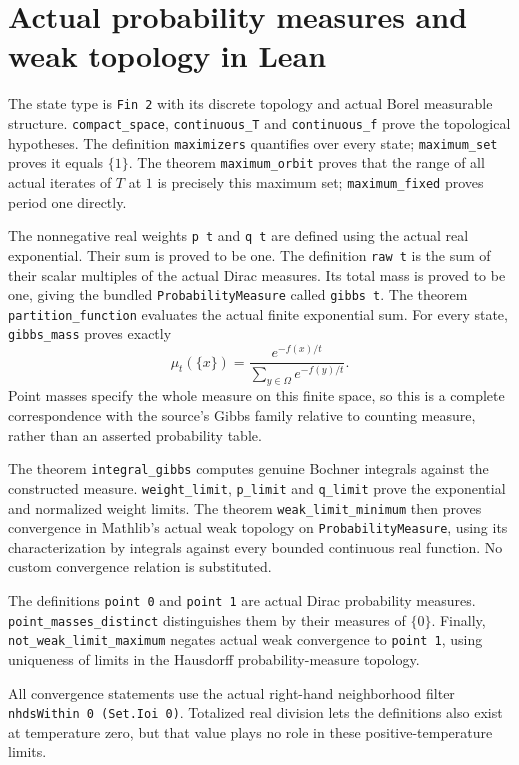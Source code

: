 \documentclass[11pt]{article}
\begin{document}
\newpage
\raggedright
\section*{Actual probability measures and weak topology in Lean}
The state type is \texttt{Fin 2} with its discrete topology and actual Borel
measurable structure. \texttt{compact\_space}, \texttt{continuous\_T} and
\texttt{continuous\_f} prove the topological hypotheses. The definition
\texttt{maximizers} quantifies over every state; \texttt{maximum\_set}
proves it equals $\{1\}$. The theorem \texttt{maximum\_orbit} proves that
the range of all actual iterates of $T$ at $1$ is precisely this maximum set;
\texttt{maximum\_fixed} proves period one directly.

The nonnegative real weights \texttt{p t} and \texttt{q t} are defined using
the actual real exponential. Their sum is proved to be one.
The definition \texttt{raw t} is the sum of their scalar multiples of the
actual Dirac measures. Its total mass is proved to be one, giving the
bundled \texttt{ProbabilityMeasure} called \texttt{gibbs t}.
The theorem \texttt{partition\_function} evaluates the actual finite
exponential sum. For every state, \texttt{gibbs\_mass} proves exactly
\[
 \mu_t(\{x\})=\frac{e^{-f(x)/t}}{\sum_{y\in\Omega} e^{-f(y)/t}}.
\]
Point masses specify the whole measure on this finite space, so this is a
complete correspondence with the source's Gibbs family relative to counting
measure, rather than an asserted probability table.

The theorem \texttt{integral\_gibbs} computes genuine Bochner integrals
against the constructed measure. \texttt{weight\_limit}, \texttt{p\_limit}
and \texttt{q\_limit} prove the exponential and normalized weight limits.
The theorem \texttt{weak\_limit\_minimum} then proves convergence in
Mathlib's actual weak topology on \texttt{ProbabilityMeasure}, using its
characterization by integrals against every bounded continuous real function.
No custom convergence relation is substituted.

The definitions \texttt{point 0} and \texttt{point 1} are actual Dirac
probability measures. \texttt{point\_masses\_distinct} distinguishes them
by their measures of $\{0\}$. Finally, \texttt{not\_weak\_limit\_maximum}
negates actual weak convergence to \texttt{point 1}, using uniqueness of
limits in the Hausdorff probability-measure topology.

All convergence statements use the actual right-hand neighborhood filter
\texttt{nhdsWithin 0 (Set.Ioi 0)}. Totalized real division lets the definitions
also exist at temperature zero, but that value plays no role in these
positive-temperature limits.
\end{document}
